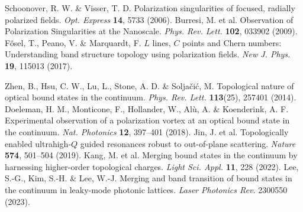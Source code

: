 \documentclass[%
 reprint,
superscriptaddress,
 amsmath,amssymb, aps,
]{revtex4-1}
\begin{document}
\begin{thebibliography}{1}
 Schoonover, R. W. \& Visser, T. D. Polarization singularities of focused, radially polarized fields. \emph{Opt. Express} {\bf 14}, 5733 (2006).
 Burresi, M. et al. Observation of Polarization Singularities at the Nanoscale. \emph{Phys. Rev. Lett.} {\bf 102}, 033902 (2009).
 F\"{o}sel, T., Peano, V. \& Marquardt, F. $L$ lines, $C$ points and Chern numbers: Understanding band structure topology using polarization fields. \emph{New J. Phys.} {\bf 19}, 115013 (2017).

 Zhen, B., Hsu, C. W., Lu, L., Stone, A. D. \& Solja\v{c}i\'{c}, M. Topological nature of optical bound states in the continuum. \emph{Phys. Rev. Lett.} {\bf 113}(25), 257401 (2014).
 Doeleman, H. M., Monticone, F., Hollander, W., Al\`{u}, A. \& Koenderink, A. F. Experimental observation of a polarization vortex at an optical bound state in the continuum. \emph{Nat. Photonics} {\bf 12}, 397--401 (2018).
 Jin, J. et al. Topologically enabled ultrahigh-$Q$ guided resonances robust to out-of-plane scattering. \emph{Nature} {\bf 574}, 501--504 (2019).
 Kang, M. et al. Merging bound states in the continuum by harnessing higher-order topological charges. \emph{Light Sci. Appl.} {\bf 11}, 228 (2022).
  Lee, S.-G., Kim, S.-H. \& Lee, W.-J. Merging and band transition of bound states in the continuum in leaky-mode photonic lattices. \emph{Laser Photonics Rev.} 2300550 (2023).


\end{thebibliography}
\end{document}
